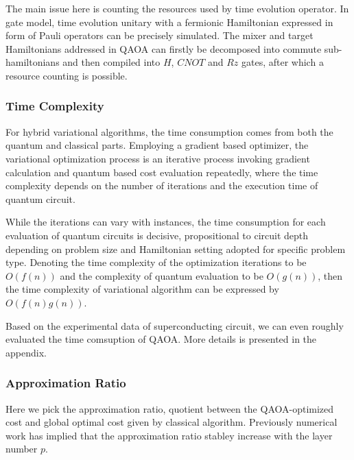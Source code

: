 \documentclass[aps,pra,twocolumn,superscriptaddress]{revtex4-2}
\begin{document}
The main issue here is counting the resources used by time evolution operator. In gate model, time evolution unitary with a fermionic Hamiltonian expressed in form of Pauli operators can be precisely simulated\cite{}. %
The mixer and target Hamiltonians addressed in QAOA can firstly be decomposed into commute sub-hamiltonians and then compiled into $H$, $CNOT$ and $Rz$ gates, after which a resource counting is possible. %


\subsubsection{Time Complexity}
For hybrid variational algorithms, the time consumption comes from both the quantum and classical parts. Employing a gradient based optimizer, the variational optimization process is an iterative process invoking gradient calculation and quantum based cost evaluation repeatedly, where the time complexity depends on the number of iterations and the execution time of quantum circuit. 

While the iterations can vary with instances, the time consumption for each evaluation of quantum circuits is decisive, propositional to circuit depth depending on problem size and  Hamiltonian setting adopted for specific problem type. Denoting the time complexity of the optimization iterations to be $O(f(n))$ and the complexity of quantum evaluation to be $O(g(n))$, then the time complexity of variational algorithm can be expressed by $O(f(n) g(n))$.

Based on the experimental data of superconducting circuit, we can even roughly evaluated the time comsuption of QAOA. More details is presented in the appendix.


\subsubsection{Approximation Ratio}
Here we pick the approximation ratio, quotient between the QAOA-optimized cost and global optimal cost given by classical algorithm.
Previously numerical work has implied that the approximation ratio stabley increase with the layer number $p$.
\end{document}

